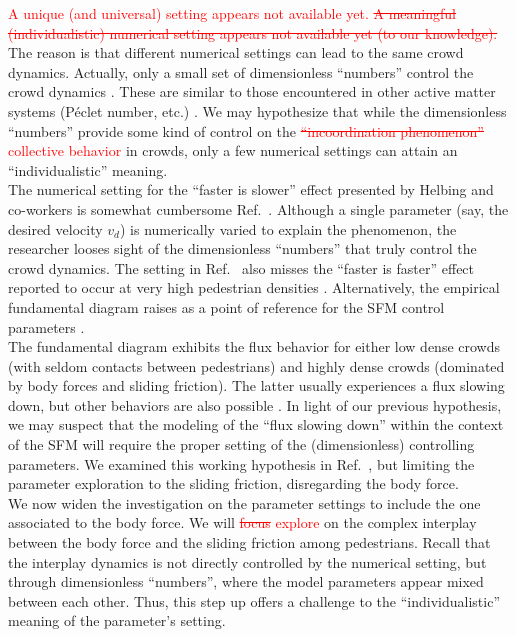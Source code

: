 \documentclass[preprint,12pt]{elsarticle}
\begin{document}
\textcolor{red}{A unique (and universal) setting appears not available yet. 
\sout{A meaningful (individualistic) numerical setting appears not available yet (to 
our knowledge).}} The reason is that different numerical settings can lead to 
the same crowd dynamics. Actually, only a small set of dimensionless 
``numbers'' control the crowd dynamics \cite{dorso_2019}. These are similar to 
those encountered in other active matter systems (P\'eclet number, etc.)  
\cite{marchetti_2014}. We may hypothesize that while the dimensionless 
``numbers'' provide some kind of control on the \textcolor{red}{\sout{
``incoordination phenomenon''} collective behavior} in 
crowds, only a few numerical settings can attain an ``individualistic'' 
meaning. 
 \\

The numerical setting for the ``faster is slower'' effect presented by 
Helbing and co-workers is somewhat cumbersome 
Ref.~\cite{helbing_2000,dorso_2017,dorso_2019}. Although a single 
parameter (say, the desired velocity $v_d$) is numerically varied to 
explain the phenomenon, the researcher looses sight of the dimensionless 
``numbers'' that truly control the crowd dynamics. The setting in 
Ref.~\cite{helbing_2000} also misses the ``faster is faster'' effect reported 
to occur at very high pedestrian densities \cite{dorso_2017,haghani_2019}. 
Alternatively, the empirical fundamental diagram raises as a point of reference 
for the SFM control parameters \cite{helbing_2007,dorso_2017}. \\

The fundamental diagram exhibits the flux behavior for either low dense crowds 
(with seldom contacts between pedestrians) and highly dense crowds (dominated 
by 
body forces and sliding friction). The latter usually experiences a flux 
slowing 
down, but other behaviors are also possible \cite{helbing_2007,lohner_2018}. In 
light of our previous hypothesis, we may suspect that the  modeling of the 
``flux slowing down'' within the context of the SFM will require the proper 
setting of the (dimensionless) controlling parameters. We examined this working 
hypothesis in Ref.~\cite{dorso_2019}, but limiting the parameter exploration to 
the sliding friction, disregarding the body force. \\

We now widen the investigation on the parameter settings to include the one 
associated to the body force. We will \textcolor{red}{\sout{focus} explore} 
on the complex interplay between 
the body force and the sliding friction among pedestrians. Recall that the 
interplay dynamics is not directly controlled by the numerical setting, but 
through dimensionless ``numbers'', where the model parameters appear mixed 
between each other. Thus, this step up offers a challenge to the 
``individualistic'' meaning of the parameter's setting. \\  
\end{document}
